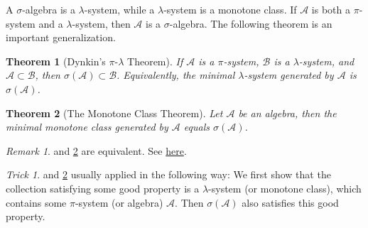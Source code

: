 \documentclass[openany]{book}
\newtheorem{theorem}{Theorem}[chapter]
\theoremstyle{definition}
\theoremstyle{remark}
\newtheorem*{remark}{Remark}
\newtheorem*{trick}{Trick}
\begin{document}
A $\sigma$-algebra is a $\lambda$-system, while a $\lambda$-system is a monotone class. If $\mathcal{A}$ is both a $\pi$-system and a $\lambda$-system, then $\mathcal{A}$ is a $\sigma$-algebra. The following theorem is an important generalization.
\begin{theorem}[Dynkin's $\pi$-$\lambda$ Theorem]\label{thm:piLambda}
    If $\mathcal{A}$ is a $\pi$-system, $\mathcal{B}$ is a $\lambda$-system, and $\mathcal{A}\subset \mathcal{B}$, then $\sigma(\mathcal{A})\subset \mathcal{B}$. Equivalently, the minimal $\lambda$-system generated by $\mathcal{A}$ is $\sigma(\mathcal{A})$.
\end{theorem}
\begin{theorem}[The Monotone Class Theorem]\label{thm:monotoneClass}
    Let $\mathcal{A}$ be an algebra, then the minimal monotone class generated by $\mathcal{A}$ equals $\sigma(\mathcal{A})$.
\end{theorem}
\begin{remark}
     and \ref{thm:monotoneClass} are equivalent. See \href{https://math.stackexchange.com/questions/1841193/monotone-class-theorem-and-another-similar-theorem}{here}.
\end{remark}
\begin{trick}
     and \ref{thm:monotoneClass} usually applied in the following way: We first show that the collection satisfying some good property is a $\lambda$-system (or monotone class), which contains some $\pi$-system (or algebra) $\mathcal{A}$. Then $\sigma(\mathcal{A})$ also satisfies this good property.
\end{trick}
\end{document}
